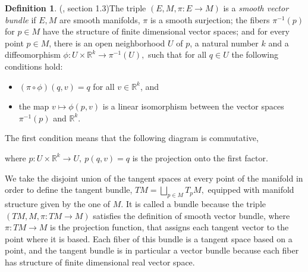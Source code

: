 \documentclass[12pt, letterpaper, reqno]{amsart}
\theoremstyle{definition}
\newtheorem{df}{Definition}
\theoremstyle{plain}
\theoremstyle{remark}
\begin{document}
\begin{df}(\cite{luke2013vector}, section 1.3)\label{def:smooth_vector_bundle}
	The triple $ (E, M, \pi: E \rightarrow {M}) $ is a \textit{smooth vector bundle} if $ E,M $ are smooth manifolds, $ \pi $ is a smooth surjection; the fibers $ \pi^{-1}(p) $ for $ p\in M $  have the structure of finite dimensional vector spaces; and for every point $ p\in M $, there is an open neighborhood $ U $ of $ p $, a natural number $ k $ and a diffeomorphism $ \phi: U\times \mathbb{R}^k \rightarrow  \pi^{-1}(U),$ such that for all $ q\in U $ the following conditions hold:  

	\begin{itemize}
		\item $ (\pi\circ \phi)(q,v)=q $ for all $ v\in \mathbb{R}^k $, and  
		\item the map $ v \mapsto \phi(p,v) $ is a linear isomorphism between the vector spaces $\pi^{-1}(p) $ and $ \mathbb{R}^k. $     
	\end{itemize}
	The first condition means that the following diagram is commutative,	
	\begin{center}
	\end{center}
	where $ p:U\times \mathbb{R}^k \rightarrow U, \ p(q,v)=q$ is the projection onto the first factor.
\end{df}
We take the disjoint union of the tangent spaces at every point of the manifold in order to define the tangent bundle,
$ TM = \bigsqcup_{p\in M} T_pM, $ 
equipped with manifold structure given by the one of $ M. $ It is called a bundle because the triple $ (TM, M,\pi:TM \rightarrow {M}) $ satisfies the definition of smooth vector bundle, where $ \pi:TM \rightarrow {M} $  is the projection function, that assigns each tangent vector to the point where it is based. Each fiber of this bundle is a tangent space based on a point, and the tangent bundle is in particular a vector bundle because each fiber has structure of finite dimensional real vector space.
\end{document}
